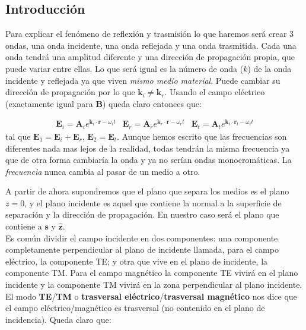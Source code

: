 \documentclass[12pt,a4paper]{article}
\newcommand{\Bn}{\mathbf{B}}
\newcommand{\En}{\mathbf{E}}
\newcommand{\kn}{\mathbf{k}}
\newcommand{\rn}{\mathbf{r}}
\newcommand{\An}{\mathbf{A}}
\newcommand{\sn}{\mathbf{s}}
\newcommand{\hnz}{\hat{\mathbf{z}}}
\numberwithin{equation}{section}
\numberwithin{figure}{section}
\begin{document}
\subsection{Introducción}

Para explicar el fenómeno de reflexión y trasmisión lo que haremos será crear 3 ondas, una onda incidente, una onda reflejada y una onda trasmitida. Cada una onda tendrá una amplitud diferente y una dirección de propagación propia, que puede variar entre ellas. Lo que será igual es la número de onda ($k$) de la onda incidente y reflejada ya que viven \textit{mismo medio material}. Puede cambiar su dirección de propagación por lo que $\kn_i \neq \kn_r$.  Usando el campo eléctrico (exactamente igual para $\Bn$) queda claro entonces que:

\begin{subequations}
\begin{align}
\En_i = \An_i e^{\kn_i \cdot \rn - \omega_i t}
\end{align}
\begin{align}
\En_r = \An_r e^{\kn_r \cdot \rn - \omega_r t}
\end{align}
\begin{align}
\En_t = \An_t e^{\kn_t \cdot \rn_t - \omega_t t}
\end{align}
\end{subequations}
tal que $\En_1 = \En_i  + \En_r$, $\En_2 = \En_t$.  Aunque hemos escrito que las frecuencias son diferentes nada mas lejos de la realidad, todas tendrán la misma frecuencia ya que de otra forma cambiaría la onda y ya no serían ondas monocromáticas. La \textit{frecuencia} nunca cambia al pasar de un medio a otro. 



A partir de ahora supondremos que el plano que separa los medios es el plano $z=0$, y el plano incidente es aquel que contiene la normal a la superficie de separación y la dirección de propagación. En nuestro caso será el plano que contiene a $\sn$ y $\hnz$. \\

Es común dividir el campo incidente en dos componentes: una componente completamente perpendicular al plano de incidente llamada, para el campo eléctrico, la componente TE; y otra que vive en el plano de incidente, la componente TM. Para el campo magnético la componente TE vivirá en el plano incidente y la componente TM vivirá en la zona perpendicular al plano incidente. El modo \textbf{TE}/\textbf{TM} o \textbf{trasversal eléctrico}/\textbf{trasversal magnético} nos dice que el campo eléctrico/magnético es trasversal (no contenido en el plano de incidencia). Queda claro que:
\end{document}
